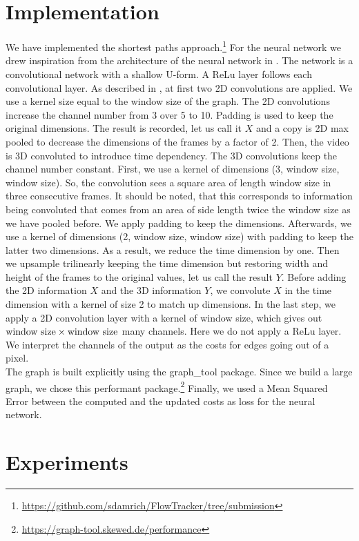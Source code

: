 \documentclass{article}
\begin{document}
{\section{Implementation}\label{Implementation}
We have implemented the shortest paths approach.\footnote{\url{https://github.com/sdamrich/FlowTracker/tree/submission}}  For the neural network we drew inspiration from the architecture of the neural network in \cite{Lee17}. The network is a convolutional network with a shallow U-form. A ReLu layer follows each convolutional layer. As described in \cite{Lee17}, at first two 2D convolutions are applied. We use a kernel size equal to the window size of the graph. The 2D convolutions increase the channel number from 3 over 5 to 10. Padding is used to keep the original dimensions. The result is recorded, let us call it $X$ and a copy is 2D max pooled to decrease the dimensions of the frames by a factor of 2. Then, the video is 3D convoluted to introduce time dependency. The 3D convolutions keep the channel number constant.  First, we use a kernel of dimensions (3, window size, window size). So, the convolution sees a square area of length window size in three consecutive frames. It should be noted, that this corresponds to information being convoluted that comes from an area of side length twice the window size as we have pooled before. We apply padding to keep the dimensions. Afterwards, we use a kernel of dimensions (2, window size, window size) with padding to keep the latter two dimensions. As a result, we reduce the time dimension by one. Then we upsample trilinearly keeping the time dimension but restoring width and height of the frames to the original values, let us call the result $Y$. Before adding the 2D information $X$ and the 3D information $Y$, we convolute $X$ in the time dimension with a kernel of size 2 to match up dimensions. 
In the last step, we apply a 2D convolution layer with a kernel of window size, which gives out $\textnormal{window size}\times\textnormal{window size}$ many channels. Here we do not apply a ReLu layer. We interpret the channels of the output as the costs for edges going out of a pixel.\\ 
The graph is built explicitly using the 
graph\_tool package. Since we build a large graph, we chose this performant package.\footnote{\url{https://graph-tool.skewed.de/performance}} Finally, we used a Mean Squared Error between the computed and the updated costs as loss for the neural network.

\section{Experiments}
}
\end{document}
